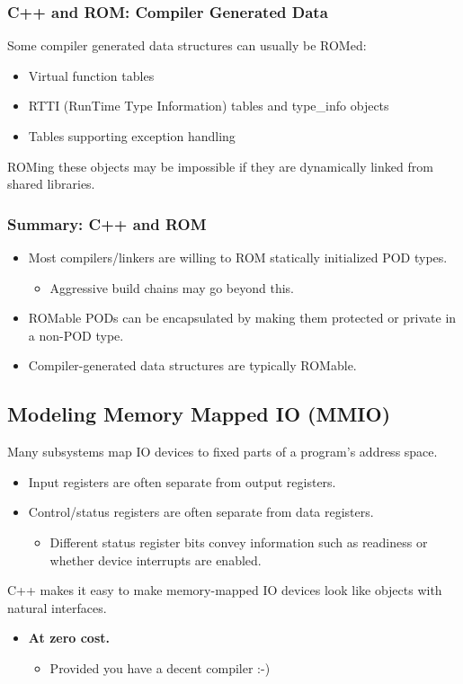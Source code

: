 \subsubsection{C++ and ROM: Compiler Generated Data}
Some compiler generated data structures can usually be ROMed:
\begin{itemize}
  \item Virtual function tables
  \item RTTI (RunTime Type Information) tables and type\_info objects
  \item Tables supporting exception handling
\end{itemize}
ROMing these objects may be impossible if they are dynamically linked from shared libraries.

\subsubsection{Summary: C++ and ROM}
\begin{itemize}
  \item Most compilers/linkers are willing to ROM statically initialized POD types.
  \begin{itemize}
    \item Aggressive build chains may go beyond this.
  \end{itemize}
  \item ROMable PODs can be encapsulated by making them protected or private in a non-POD type.
  \item Compiler-generated data structures are typically ROMable.
\end{itemize}


\subsection{Modeling Memory Mapped IO (MMIO)}
Many subsystems map IO devices to fixed parts of a program's address space.
\begin{itemize}
  \item Input registers are often separate from output registers.
  \item Control/status registers are often separate from data registers.
  \begin{itemize}
    \item Different status register bits convey information such as readiness or whether device interrupts are enabled.
  \end{itemize}
\end{itemize}
C++ makes it easy to make memory-mapped IO devices look like objects with natural interfaces.
\begin{itemize}
  \item \textbf{At zero cost.}
  \begin{itemize}
    \item Provided you have a decent compiler :-)
  \end{itemize}
\end{itemize}

